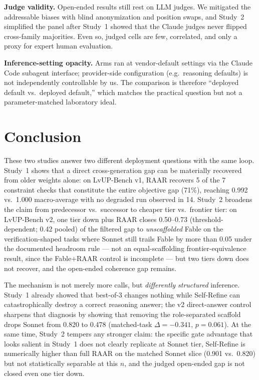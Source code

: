 \documentclass[journal]{IEEEtran}
\newcommand{\method}{RAAR}
\newcommand{\bench}{LvUP-Bench}
\begin{document}
\textbf{Judge validity.} Open-ended results still rest on LLM judges. We
mitigated the addressable biases with blind anonymization and position
swaps, and Study~2 simplified the panel after Study~1 showed that the
Claude judges never flipped cross-family majorities. Even so, judged cells
are few, correlated, and only a proxy for expert human evaluation.

\textbf{Inference-setting opacity.} Arms ran at vendor-default settings via
the Claude Code subagent interface; provider-side configuration
(e.g.\ reasoning defaults) is not independently controllable by us. The
comparison is therefore ``deployed default vs.\ deployed default,'' which
matches the practical question but not a parameter-matched laboratory ideal.

\section{Conclusion}
These two studies answer two different deployment questions with the same
loop. Study~1 shows that a direct cross-generation gap can be materially
recovered from older weights alone: on \bench{} v1, \method{} recovers 5 of
the 7 constraint checks that constitute the entire objective gap
(71\%), reaching 0.992 vs.\ 1.000 macro-average with no degraded run
observed in 14. Study~2 broadens the claim from predecessor vs.\ successor
to cheaper tier vs.\ frontier tier: on \bench{} v2, one tier down plus
\method{} closes 0.50--0.73 (threshold-dependent; 0.42 pooled) of the
filtered gap to \emph{unscaffolded} Fable on the verification-shaped tasks
where Sonnet still trails Fable by more than 0.05 under the documented
headroom rule --- not an equal-scaffolding frontier-equivalence result, since
the Fable+\method{} control is incomplete --- but two tiers down does not recover,
and the open-ended coherence gap remains.

The mechanism is not merely more calls, but \emph{differently structured}
inference. Study~1 already showed that best-of-3 changes nothing while
Self-Refine can catastrophically destroy a correct reasoning answer; the v2
direct-answer control sharpens that diagnosis by showing that removing the
role-separated scaffold drops Sonnet from 0.820 to 0.478 (matched-task
$\Delta=-0.341$, $p{=}0.061$). At the same time, Study~2 tempers any
stronger claim: the specific gate advantage that looks salient in Study~1
does not clearly replicate at Sonnet tier, Self-Refine is numerically higher
than full \method{} on the matched Sonnet slice (0.901 vs.\ 0.820) but not
statistically separable at this $n$, and the judged open-ended gap is not
closed even one tier down.
\end{document}
